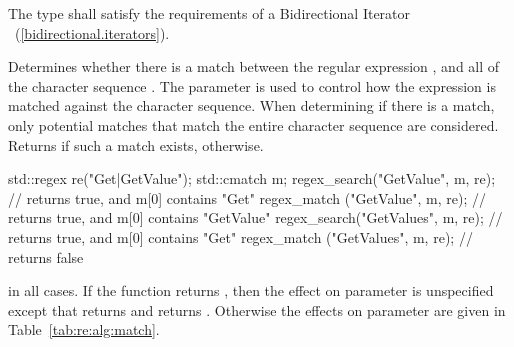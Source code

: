 \begin{itemdescr}
\pnum
\requires  The type  shall satisfy the requirements
of a Bidirectional Iterator ~(\ref{bidirectional.iterators}).

\pnum
\effects  Determines whether there is a match between the
regular expression , and all of the character
sequence . The parameter  is
used to control how the expression is matched against the character
sequence. When determining if there is a match, only potential matches
that match the entire character sequence are considered.
Returns  if such a match exists, 
otherwise.
\begin{example}
\begin{codeblock}
std::regex re("Get|GetValue");
std::cmatch m;
regex_search("GetValue", m, re);	// returns true, and m[0] contains "Get"
regex_match ("GetValue", m, re);	// returns true, and m[0] contains "GetValue"
regex_search("GetValues", m, re);	// returns true, and m[0] contains "Get"
regex_match ("GetValues", m, re);	// returns false
\end{codeblock}
\end{example}

\pnum
\postconditions
{} in all cases.
If the function returns , then the effect
on parameter  is unspecified except that 
returns  and  returns .
Otherwise the effects on parameter  are given in
Table~\ref{tab:re:alg:match}.
\end{itemdescr}

